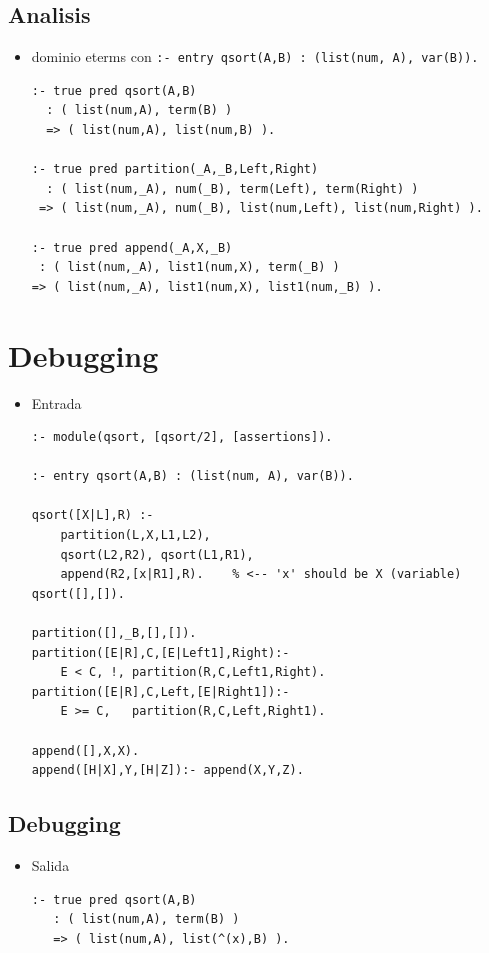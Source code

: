 \documentclass[11pt]{article}
\begin{document}
\subsection*{Analisis}
\label{sec:org9f4fbe1}
\begin{itemize}
\item dominio eterms con  \texttt{:- entry qsort(A,B) : (list(num, A), var(B)).} 
\begin{verbatim}
:- true pred qsort(A,B)
  : ( list(num,A), term(B) )
  => ( list(num,A), list(num,B) ).

:- true pred partition(_A,_B,Left,Right)
  : ( list(num,_A), num(_B), term(Left), term(Right) )
 => ( list(num,_A), num(_B), list(num,Left), list(num,Right) ).

:- true pred append(_A,X,_B)
 : ( list(num,_A), list1(num,X), term(_B) )
=> ( list(num,_A), list1(num,X), list1(num,_B) ).
\end{verbatim}
\end{itemize}

\section*{Debugging}
\label{sec:orgabe0345}
\begin{itemize}
\item Entrada
\begin{verbatim}
:- module(qsort, [qsort/2], [assertions]).

:- entry qsort(A,B) : (list(num, A), var(B)).

qsort([X|L],R) :-
    partition(L,X,L1,L2),
    qsort(L2,R2), qsort(L1,R1), 
    append(R2,[x|R1],R).    % <-- 'x' should be X (variable)
qsort([],[]).

partition([],_B,[],[]).
partition([E|R],C,[E|Left1],Right):- 
    E < C, !, partition(R,C,Left1,Right).
partition([E|R],C,Left,[E|Right1]):-
    E >= C,   partition(R,C,Left,Right1).

append([],X,X).
append([H|X],Y,[H|Z]):- append(X,Y,Z).

\end{verbatim}
\end{itemize}

\subsection*{Debugging}
\label{sec:orge7b379f}
\begin{itemize}
\item Salida
\begin{verbatim}
:- true pred qsort(A,B)
   : ( list(num,A), term(B) )
   => ( list(num,A), list(^(x),B) ).

\end{verbatim}
\end{itemize}
\end{document}
